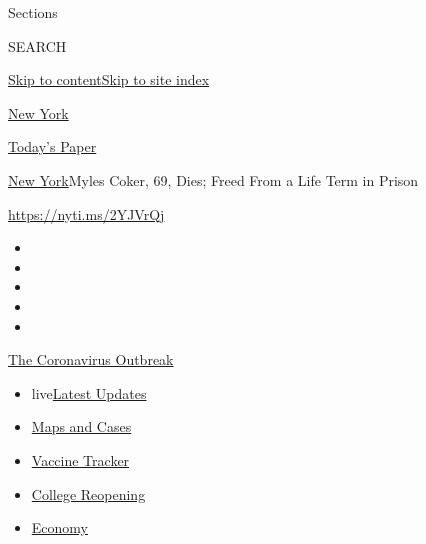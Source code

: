Sections

SEARCH

\protect\hyperlink{site-content}{Skip to
content}\protect\hyperlink{site-index}{Skip to site index}

\href{https://www.nytimes3xbfgragh.onion/section/nyregion}{New York}

\href{https://myaccount.nytimes3xbfgragh.onion/auth/login?response_type=cookie\&client_id=vi}{}

\href{https://www.nytimes3xbfgragh.onion/section/todayspaper}{Today's
Paper}

\href{/section/nyregion}{New York}\textbar{}Myles Coker, 69, Dies; Freed
From a Life Term in Prison

\url{https://nyti.ms/2YJVrQj}

\begin{itemize}
\item
\item
\item
\item
\item
\end{itemize}

\href{https://www.nytimes3xbfgragh.onion/news-event/coronavirus?action=click\&pgtype=Article\&state=default\&region=TOP_BANNER\&context=storylines_menu}{The
Coronavirus Outbreak}

\begin{itemize}
\tightlist
\item
  live\href{https://www.nytimes3xbfgragh.onion/2020/08/04/world/coronavirus-covid-19.html?action=click\&pgtype=Article\&state=default\&region=TOP_BANNER\&context=storylines_menu}{Latest
  Updates}
\item
  \href{https://www.nytimes3xbfgragh.onion/interactive/2020/us/coronavirus-us-cases.html?action=click\&pgtype=Article\&state=default\&region=TOP_BANNER\&context=storylines_menu}{Maps
  and Cases}
\item
  \href{https://www.nytimes3xbfgragh.onion/interactive/2020/science/coronavirus-vaccine-tracker.html?action=click\&pgtype=Article\&state=default\&region=TOP_BANNER\&context=storylines_menu}{Vaccine
  Tracker}
\item
  \href{https://www.nytimes3xbfgragh.onion/2020/08/02/us/covid-college-reopening.html?action=click\&pgtype=Article\&state=default\&region=TOP_BANNER\&context=storylines_menu}{College
  Reopening}
\item
  \href{https://www.nytimes3xbfgragh.onion/live/2020/08/03/business/stock-market-today-coronavirus?action=click\&pgtype=Article\&state=default\&region=TOP_BANNER\&context=storylines_menu}{Economy}
\end{itemize}

